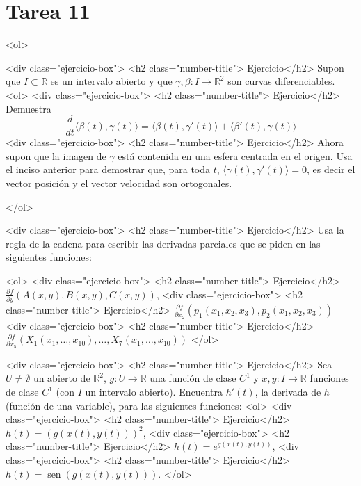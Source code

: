 \documentclass{article}
\theoremstyle{definition}
\newcommand{\sen}{\operatorname{sen}}
\begin{document}
\section*{Tarea 11 }


<ol>


  <div class="ejercicio-box"> <h2 class="number-title"> Ejercicio</h2> Supon que $I\subset \mathbb{R}$ es un intervalo abierto
    y que $\gamma,\beta :I\to \mathbb{R}^2$  son curvas diferenciables.
    <ol>
      <div class="ejercicio-box"> <h2 class="number-title"> Ejercicio</h2> Demuestra
        $$
        \frac{d}{dt} \langle \beta(t), \gamma(t) \rangle
        =\langle \beta(t), \gamma'(t) \rangle
        + \langle \beta'(t) , \gamma(t) \rangle
        $$
      <div class="ejercicio-box"> <h2 class="number-title"> Ejercicio</h2> Ahora supon que la imagen de $\gamma$ está contenida
        en una esfera centrada en el origen. Usa el inciso anterior
        para demostrar que, para toda $t$,
        $\langle \gamma(t), \gamma'(t)\rangle=0$, es decir
        el vector posición y el vector velocidad son ortogonales.

      </ol>
      
  <div class="ejercicio-box"> <h2 class="number-title"> Ejercicio</h2> Usa la regla de la cadena para escribir las derivadas 
    parciales que se piden en las siguientes funciones:

    <ol>
    <div class="ejercicio-box"> <h2 class="number-title"> Ejercicio</h2> $\frac{\partial f}{\partial y}(A(x,y),B(x,y),C(x,y))$,
    <div class="ejercicio-box"> <h2 class="number-title"> Ejercicio</h2> $\frac{\partial f}{\partial x_2}(p_1(x_1,x_2,x_3),p_2(x_1,x_2,x_3))$
    <div class="ejercicio-box"> <h2 class="number-title"> Ejercicio</h2> $\frac{\partial f}{\partial x_5}
      (X_1(x_1, \dots, x_{10}), \dots, X_{7}(x_1,\dots, x_{10}))$
    </ol>

<div class="ejercicio-box"> <h2 class="number-title"> Ejercicio</h2> Sea $U\ne \emptyset$ un abierto de
  $\mathbb{R}^2$, $g:U\to \mathbb{R}$ una función de clase $C^1$
  y $x,y:I\to \mathbb{R}$ funciones  de clase $C^1$
  (con $I$ un intervalo abierto).
  Encuentra $h'(t)$, la derivada de
  $h$ (función de una variable), para las siguientes funciones:
  <ol>
  <div class="ejercicio-box"> <h2 class="number-title"> Ejercicio</h2> $h(t)=(g(x(t), y(t)))^2$,
  <div class="ejercicio-box"> <h2 class="number-title"> Ejercicio</h2> $h(t)=e^{g(x(t),y(t))}$,
  <div class="ejercicio-box"> <h2 class="number-title"> Ejercicio</h2> $h(t)=\sen(g(x(t),y(t)))$.
  </ol>
\end{document}
